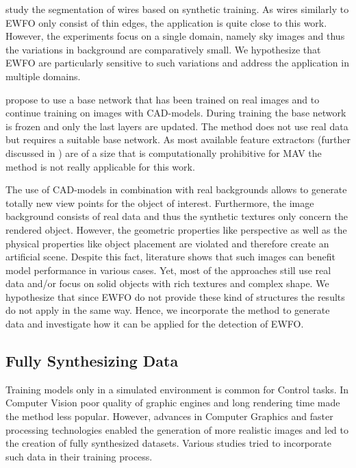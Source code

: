 \citeauthor{Madaan2017}\cite{Madaan2017} study the segmentation of wires based on synthetic training. As wires similarly to \ac{EWFO} only consist of thin edges, the application is quite close to this work. However, the experiments focus on a single domain, namely sky images and thus the variations in background are comparatively small. We hypothesize that \ac{EWFO} are particularly sensitive to such variations and address the application in multiple domains.

\citeauthor{Hinterstoisser2017} \cite{Hinterstoisser2017} propose to use a base network that has been trained on real images and to continue training on images with \ac{CAD}-models. During training the base network is frozen and only the last layers are updated. The method does not use real data but requires a suitable base network. As most available feature extractors (further discussed in ) are of a size that is computationally prohibitive for \ac{MAV} the method is not really applicable for this work. 

The use of CAD-models in combination with real backgrounds allows to generate totally new view points for the object of interest. Furthermore, the image background consists of real data and thus the synthetic textures only concern the rendered object. However, the geometric properties like perspective as well as the physical properties like object placement are violated and therefore create an artificial scene. Despite this fact, literature shows that such images can benefit model performance in various cases. Yet, most of the approaches still use real data and/or focus on solid objects with rich textures and complex shape. We hypothesize that since \ac{EWFO} do not provide these kind of structures the results do not apply in the same way. Hence, we incorporate the method to generate data and investigate how it can be applied for the detection of \ac{EWFO}.

\subsection{Fully Synthesizing Data}

Training models only in a simulated environment is common for Control tasks. In Computer Vision poor quality of graphic engines and long rendering time made the method less popular. However, advances in Computer Graphics and faster processing technologies enabled the generation of more realistic images and led to the creation of fully synthesized datasets\cite{Ros2016, Gaidon2016}. Various studies tried to incorporate such data in their training process.

